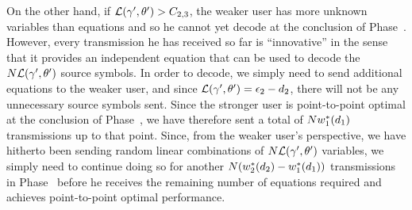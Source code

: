 



On the other hand, if $\mathcal{L}(\gamma', \theta') > C_{2, 3}$, the weaker user has more unknown variables than equations and so he cannot yet decode at the conclusion of Phase~.  However, every transmission he has received so far is ``innovative'' in the sense that it provides an independent equation that can be used to decode the $N\mathcal{L}(\gamma', \theta')$ source symbols.  In order to decode, we simply need to send additional equations to the weaker user, and since $\mathcal{L}(\gamma', \theta') = \epsilon_2 - d_2$, there will not be any unnecessary source symbols sent.  Since the stronger user is point-to-point optimal at the conclusion of Phase~, we have therefore sent a total of $Nw_{1}^{*}(d_1)$ transmissions up to that point.  Since, from the weaker user's perspective, we have hitherto been sending random linear combinations of $N\mathcal{L}(\gamma', \theta')$ variables, we simply need to continue doing so for another $N(w_{2}^{*}(d_2) - w_{1}^{*}(d_1))$ transmissions in Phase~ before he receives the remaining number of equations required and achieves point-to-point optimal performance.

